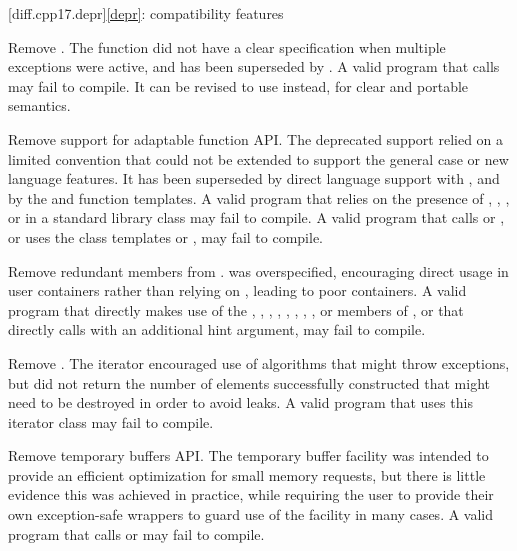 [diff.cpp17.depr]{\ref{depr}: compatibility features}

\nodiffref
\change
Remove .
\rationale
The function did not have a clear specification when multiple exceptions were
active, and has been superseded by .
\effect
A valid \CppXVII{} program that calls  may fail
to compile. It can be revised to use  instead,
for clear and portable semantics.

\nodiffref
\change
Remove support for adaptable function API.
\rationale
The deprecated support relied on a limited convention that could not be
extended to support the general case or new language features. It has been
superseded by direct language support with , and by the
 and  function templates.
\effect
A valid \CppXVII{} program that relies on the presence of ,
, , or
 in a standard library class may fail to compile. A
valid \CppXVII{} program that calls  or , or uses the
class templates  or , may fail to
compile.

\nodiffref
\change
Remove redundant members from .
\rationale
{} was overspecified, encouraging direct usage in user containers
rather than relying on , leading to poor containers.
\effect
A valid \CppXVII{} program that directly makes use of the ,
, , ,
, , , , or
 members of , or that directly calls
 with an additional hint argument, may fail to compile.

\nodiffref
\change
Remove .
\rationale
The iterator encouraged use of algorithms that might throw exceptions, but did
not return the number of elements successfully constructed that might need to
be destroyed in order to avoid leaks.
\effect
A valid \CppXVII{} program that uses this iterator class may fail to compile.

\nodiffref
\change
Remove temporary buffers API.
\rationale
The temporary buffer facility was intended to provide an efficient optimization
for small memory requests, but there is little evidence this was achieved in
practice, while requiring the user to provide their own exception-safe wrappers
to guard use of the facility in many cases.
\effect
A valid \CppXVII{} program that calls  or
 may fail to compile.

